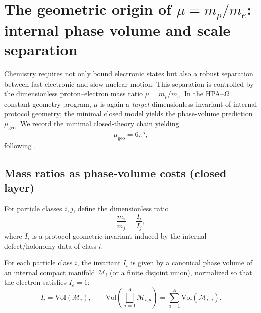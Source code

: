 \section{The geometric origin of \texorpdfstring{$\mu=m_p/m_e$}{mu}: internal phase volume and scale separation}
\label{sec:mu_geo}

Chemistry requires not only bound electronic states but also a robust separation between fast electronic and slow nuclear motion. This separation is controlled by the dimensionless proton--electron mass ratio $\mu=m_p/m_e$. In the HPA--$\Omega$ constant-geometry program, $\mu$ is again a \emph{target} dimensionless invariant of internal protocol geometry; the minimal closed model yields the phase-volume prediction $\mu_{\mathrm{geo}}$. We record the minimal closed-theory chain yielding
\begin{equation}
\mu_{\mathrm{geo}}=6\pi^5,
\end{equation}
following \cite{Ma2025PCG}.

\subsection{Mass ratios as phase-volume costs (closed layer)}
\begin{definition}\label{def:mass_ratio_chem}
For particle classes $i,j$, define the dimensionless ratio
\begin{equation}
\frac{m_i}{m_j}=\frac{I_i}{I_j},
\end{equation}
where $I_i$ is a protocol-geometric invariant induced by the internal defect/holonomy data of class $i$.
\end{definition}

\begin{axiom}\label{ax:mass_volume_chem}
For each particle class $i$, the invariant $I_i$ is given by a canonical phase volume of an internal compact manifold $\mathcal{M}_i$ (or a finite disjoint union), normalized so that the electron satisfies $I_e=1$:
\begin{equation}
I_i=\mathrm{Vol}(\mathcal{M}_i),
\qquad
\mathrm{Vol}\!\left(\bigsqcup_{a=1}^A \mathcal{M}_{i,a}\right)=\sum_{a=1}^A \mathrm{Vol}(\mathcal{M}_{i,a}).
\end{equation}
\end{axiom}

